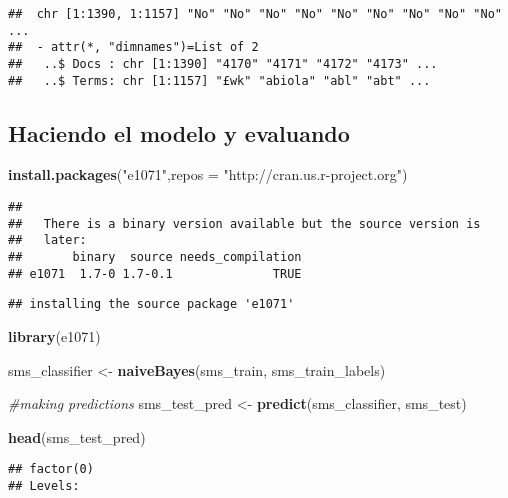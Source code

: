 \documentclass[]{article}
\newenvironment{Shaded}{\begin{snugshade}}{\end{snugshade}}
\newcommand{\KeywordTok}[1]{\textcolor[rgb]{0.13,0.29,0.53}{\textbf{#1}}}
\newcommand{\DataTypeTok}[1]{\textcolor[rgb]{0.13,0.29,0.53}{#1}}
\newcommand{\StringTok}[1]{\textcolor[rgb]{0.31,0.60,0.02}{#1}}
\newcommand{\CommentTok}[1]{\textcolor[rgb]{0.56,0.35,0.01}{\textit{#1}}}
\newcommand{\NormalTok}[1]{#1}
\begin{document}
\begin{verbatim}
##  chr [1:1390, 1:1157] "No" "No" "No" "No" "No" "No" "No" "No" "No" ...
##  - attr(*, "dimnames")=List of 2
##   ..$ Docs : chr [1:1390] "4170" "4171" "4172" "4173" ...
##   ..$ Terms: chr [1:1157] "£wk" "abiola" "abl" "abt" ...
\end{verbatim}

\subsection{Haciendo el modelo y
evaluando}\label{haciendo-el-modelo-y-evaluando}

\begin{Shaded}
\begin{Highlighting}[]
\KeywordTok{install.packages}\NormalTok{(}\StringTok{"e1071"}\NormalTok{,}\DataTypeTok{repos =} \StringTok{"http://cran.us.r-project.org"}\NormalTok{)}
\end{Highlighting}
\end{Shaded}

\begin{verbatim}
## 
##   There is a binary version available but the source version is
##   later:
##       binary  source needs_compilation
## e1071  1.7-0 1.7-0.1              TRUE
\end{verbatim}

\begin{verbatim}
## installing the source package 'e1071'
\end{verbatim}

\begin{Shaded}
\begin{Highlighting}[]
\KeywordTok{library}\NormalTok{(e1071)}
\end{Highlighting}
\end{Shaded}

\begin{Shaded}
\begin{Highlighting}[]
\NormalTok{sms_classifier <-}\StringTok{ }\KeywordTok{naiveBayes}\NormalTok{(sms_train, sms_train_labels)}

\CommentTok{#making predictions}
\NormalTok{sms_test_pred <-}\StringTok{ }\KeywordTok{predict}\NormalTok{(sms_classifier, sms_test)}

\KeywordTok{head}\NormalTok{(sms_test_pred)}
\end{Highlighting}
\end{Shaded}

\begin{verbatim}
## factor(0)
## Levels:
\end{verbatim}
\end{document}
